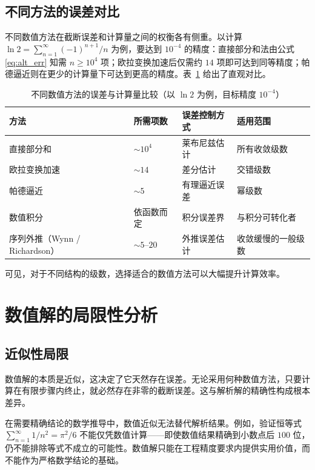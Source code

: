 \subsection{不同方法的误差对比}

不同数值方法在截断误差和计算量之间的权衡各有侧重。以计算 $\displaystyle \ln 2 = \sum_{n=1}^{\infty} (-1)^{n+1}/n$ 为例，要达到 $10^{-4}$ 的精度：直接部分和法由公式\eqref{eq:alt_err} 知需 $n \geq 10^4$ 项；欧拉变换加速后仅需约 $14$ 项即可达到同等精度；帕德逼近则在更少的计算量下可达到更高的精度。表~\ref{tab:method_compare} 给出了直观对比。

\begin{table}[htbp]
\centering
\caption{不同数值方法的误差与计算量比较（以 $\ln 2$ 为例，目标精度 $10^{-4}$）}
\label{tab:method_compare}
\begin{tabular}{llll}
\toprule
\textbf{方法} & \textbf{所需项数} & \textbf{误差控制方式} & \textbf{适用范围} \\
\midrule
直接部分和 & $\sim 10^4$ & 莱布尼兹估计 & 所有收敛级数 \\
欧拉变换加速 & $\sim 14$ & 差分估计 & 交错级数 \\
帕德逼近 & $\sim 5$ & 有理逼近误差 & 幂级数 \\
数值积分 & 依函数而定 & 积分误差界 & 与积分可转化者 \\
序列外推（Wynn / Richardson） & $\sim 5$--$20$ & 外推误差估计 & 收敛缓慢的一般级数 \\
\bottomrule
\end{tabular}
\end{table}

可见，对于不同结构的级数，选择适合的数值方法可以大幅提升计算效率。

\section{数值解的局限性分析}

\subsection{近似性局限}

数值解的本质是近似，这决定了它天然存在误差。无论采用何种数值方法，只要计算在有限步骤内终止，就必然存在非零的截断误差。这与解析解的精确性构成根本差异。

在需要精确结论的数学推导中，数值近似无法替代解析结果。例如，验证恒等式 $\displaystyle \sum_{n=1}^{\infty} 1/n^2 = \pi^2/6$ 不能仅凭数值计算——即使数值结果精确到小数点后 $100$ 位，仍不能排除等式不成立的可能性。数值解只能在工程精度要求内提供实用价值，而不能作为严格数学结论的基础。

